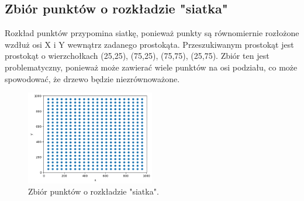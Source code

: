 \documentclass{lab}
\begin{document}
\subsection{Zbiór punktów o rozkładzie "siatka"}
Rozkład punktów przypomina siatkę, ponieważ punkty są równomiernie rozłożone wzdłuż osi X i Y wewnątrz zadanego prostokąta.
Przeszukiwanym prostokąt jest prostokąt o wierzchołkach (25,25), (75,25), (75,75), (25,75).
Zbiór ten jest problematyczny, ponieważ może zawierać wiele punktów na osi podziału, co może spowodować, że drzewo będzie niezrównoważone.

\begin{figure}[H]
  \centering
  \includegraphics[width=0.5\textwidth]{resources/grid.png}
  \caption{Zbiór punktów o rozkładzie "siatka".}
  \label{fig:grid}
\end{figure}
\end{document}
